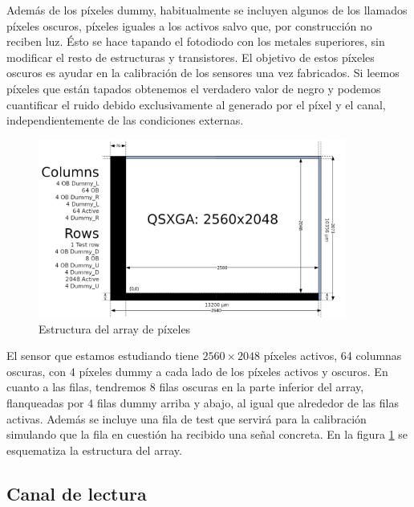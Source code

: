 Además de los píxeles dummy, habitualmente se incluyen algunos de los llamados
píxeles oscuros, píxeles iguales a los activos salvo que, por construcción no
reciben luz. Ésto se hace tapando el fotodiodo con los metales superiores,
sin modificar el resto de estructuras y transistores. El objetivo de estos píxeles
oscuros es ayudar en la calibración de los sensores una vez fabricados. Si
leemos píxeles que están tapados obtenemos el verdadero valor de negro y podemos
cuantificar el ruido debido exclusivamente al generado por el píxel y el canal,
independientemente de las condiciones externas.\\

\begin{figure}[h]
	\centering
	\includegraphics[width=0.9\textwidth]{img/pixel_array.png}
	\caption{Estructura del array de píxeles\protect\footnotemark}
	\label{fig:pxa_array}
\end{figure}

El sensor que estamos estudiando tiene $2560\times2048$ píxeles activos, 64 columnas
oscuras, con 4 píxeles dummy a cada lado de los píxeles activos y oscuros.
En cuanto a las filas, tendremos 8 filas oscuras en la parte inferior del array,
flanqueadas por 4 filas dummy arriba y abajo, al igual que alrededor de las filas
activas. Además se incluye una fila de test que servirá para la calibración simulando
que la fila en cuestión ha recibido una señal concreta. En la figura
\ref{fig:pxa_array} se esquematiza la estructura del array.\\

\subsection{Canal de lectura}

